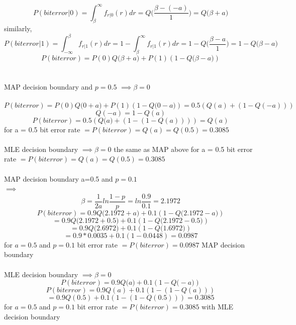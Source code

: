 \documentclass[a4paper,11pt]{article}
\begin{document}
$$P(biterror|0) = \int_{\beta}^{\infty}f_{r|0}(r) dr = Q\bigg(\frac{\beta-(-a)}{1}\bigg)= Q\big(\beta+a\big)$$
similarly,
$$P(biterror|1) = \int_{-\infty}^{\beta}f_{r|1}(r) dr=1-\int_{\beta}^{\infty}f_{r|1}(r) dr=1-Q\bigg(\frac{\beta-a}{1}\bigg)=1-Q\big(\beta-a\big)$$
$$P(biterror) = P(0)Q\big(\beta+a\big)+P(1)(1-Q\big(\beta-a\big))$$\\\\
 MAP decision boundary and $p=0.5$ $\implies \beta = 0$  \\\\
 $$P(biterror) = P(0)Q\big(0+a\big)+P(1)(1-Q\big(0-a\big)) =0.5(Q(a)+(1-Q(-a)))  $$
 $$Q(-a) = 1 - Q(a)$$
 $$P(biterror) =0.5(Q\big(a\big)+(1-(1-Q(a)))) =Q(a) $$
 for a = 0.5 bit error rate  $= P(biterror) =Q(a) = Q(0.5) = 0.3085$\\\\
 MLE decision boundary  $\implies \beta = 0$  the same as MAP above for a = 0.5 bit error rate  $= P(biterror) =Q(a) = Q(0.5) = 0.3085$\\\\
 MAP decision boundary a=0.5 and $p=0.1$\\ $\implies$\\
 $$\beta =\frac{1}{2a} ln\frac{1-p}{p}=ln\frac{0.9}{0.1}=2.1972$$
 $$P(biterror) = 0.9Q\big(2.1972+a\big)+0.1(1-Q\big(2.1972-a\big))
 $$
 $$= 0.9Q\big(2.1972+0.5\big)+0.1(1-Q\big(2.1972-0.5\big)) $$
 $$= 0.9Q\big(2.6972\big)+0.1(1-Q\big(1.6972\big)) $$
 $$= 0.9*0.0035+0.1(1-0.0448)=0.0987 $$
 for $a = 0.5$ and $p=0.1$  bit error rate  $= P(biterror) = 0.0987$  MAP decision boundary\\\\
 MLE decision boundary $\implies \beta =0$ \\
 $$P(biterror) = 0.9Q\big(a\big)+0.1(1-Q\big(-a\big))$$
 $$P(biterror) = 0.9Q(a)+0.1(1-(1-Q(a)))$$
 $$=0.9Q(0.5)+0.1(1-(1-Q(0.5))) = 0.3085$$
 for $a = 0.5$ and $p=0.1$  bit error rate  $= P(biterror) =  0.3085$ with MLE decision boundary\\\\
\end{document}
